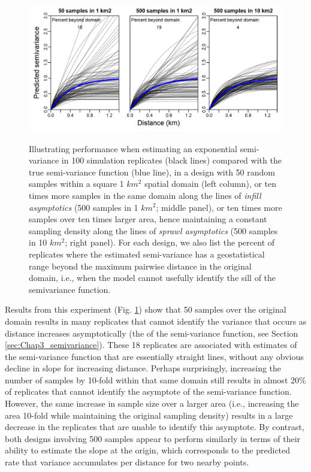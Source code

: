 \begin{figure}[!ht]
    \caption[Semi-variance estimates with increased sampling density vs. area]{Illustrating performance when estimating an exponential semi-variance in 100 simulation replicates (black lines) compared with the true semi-variance function (blue line), in a design with 50 random samples within a square 1 \(km^2\) spatial domain (left column), or ten times more samples in the same domain along the lines of \textit{infill asymptotics} (500 samples in 1 \(km^2\); middle panel), or ten times more samples over ten times larger area, hence maintaining a constant sampling density along the lines of \textit{sprawl asymptotics} (500 samples in 10 \(km^2\); right panel).  For each design, we also list the percent of replicates where the estimated semi-variance has a geostatistical range beyond the maximum pairwise distance in the original domain, i.e., when the model cannot usefully identify the sill of the semivariance function.}
    \centering
    \includegraphics[width=5.5in]{Chap_8/Infill_and_sprawl_asymptotics.png}
    \label{fig:Chap8_infill_and_sprawl}
\end{figure}

Results from this experiment (Fig. \ref{fig:Chap8_infill_and_sprawl}) show that 50 samples over the original domain results in many replicates that cannot identify the variance that occurs as distance increases asymptotically (the  of the semi-variance function, see Section \ref{sec:Chap3_semivariance}).  These 18 replicates are associated with estimates of the semi-variance function that are essentially straight lines, without any obvious decline in slope for increasing distance.  Perhaps surprisingly, increasing the number of samples by 10-fold within that same domain still results in almost 20\% of replicates that cannot identify the asymptote of the semi-variance function.  However, the same increase in sample size over a larger area (i.e., increasing the area 10-fold while maintaining the original sampling density) results in a large decrease in the replicates that are unable to identify this asymptote.  By contrast, both designs involving 500 samples appear to perform similarly in terms of their ability to estimate the slope at the origin, which corresponds to the predicted rate that variance accumulates per distance for two nearby points.  

